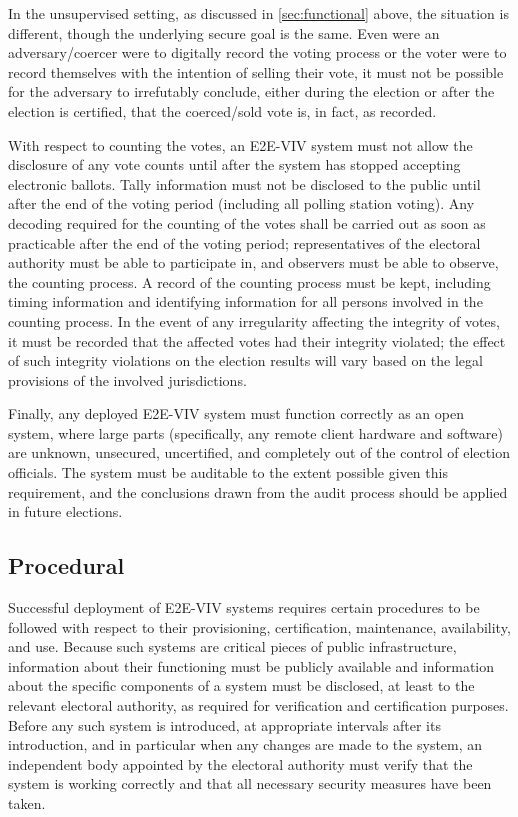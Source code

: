 In the unsupervised setting, as discussed in
\autoref{sec:functional} above, the situation is different,
though the underlying secure goal is the same.  Even were an
adversary/coercer were to digitally record the voting process or the
voter were to record themselves with the intention of selling their
vote, it must not be possible for the adversary to irrefutably
conclude, either during the election or after the election is
certified, that the coerced/sold vote is, in fact, as recorded.

With respect to counting the votes, an E2E-VIV system must not allow
the disclosure of any vote counts until after the system has stopped
accepting electronic ballots. Tally information must not be disclosed
to the public until after the end of the voting period (including all
polling station voting). Any decoding required for the counting of the
votes shall be carried out as soon as practicable after the end of the
voting period; representatives of the electoral authority must be able
to participate in, and observers must be able to observe, the counting
process. A record of the counting process must be kept, including
timing information and identifying information for all persons
involved in the counting process. In the event of any irregularity
affecting the integrity of votes, it must be recorded that the
affected votes had their integrity violated; the effect of such
integrity violations on the election results will vary based on the
legal provisions of the involved jurisdictions.

Finally, any deployed E2E-VIV system must function correctly as an
open system, where large parts (specifically, any remote client
hardware and software) are unknown, unsecured, uncertified, and
completely out of the control of election officials. The system must
be auditable to the extent possible given this requirement, and the
conclusions drawn from the audit process should be applied in future
elections.

\subsection{Procedural}

Successful deployment of E2E-VIV systems requires certain procedures
to be followed with respect to their provisioning, certification,
maintenance, availability, and use. Because such systems are critical
pieces of public infrastructure, information about their functioning
must be publicly available and information about the specific
components of a system must be disclosed, at least to the relevant
electoral authority, as required for verification and certification
purposes. Before any such system is introduced, at appropriate
intervals after its introduction, and in particular when any changes
are made to the system, an independent body appointed by the electoral
authority must verify that the system is working correctly and that
all necessary security measures have been taken.

